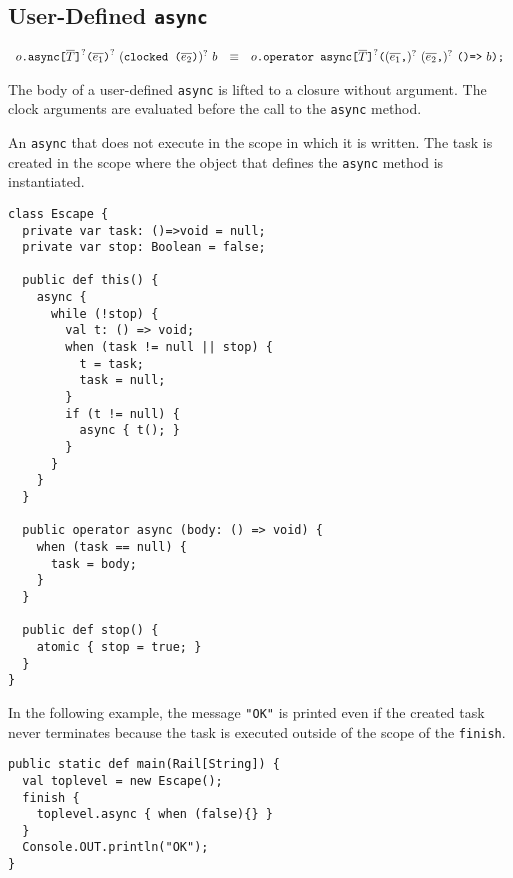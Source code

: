 \subsection{User-Defined \texttt{async}}
$$
\begin{array}{rcl}
  {o}\texttt{.async}\texttt{[}{\overline{T}}\texttt{]}^?\texttt{(}{\overline{e_1}}\texttt{)}^?~(\texttt{clocked~(}{\overline{e_2}}\texttt{)})^?~{b}
  & \equiv &
  {o}\texttt{.operator~async}\texttt{[}{\overline{T}}\texttt{]}^?\texttt{(} ({\overline{e_1}}\texttt{,})^?~ ({\overline{e_2}}\texttt{,})^?~ \texttt{()=>}~{b}\texttt{);}
\end{array}
$$

The body of a user-defined \verb+async+ is lifted to a closure without
argument. The clock arguments are evaluated before the call to the
\verb+async+ method.

\begin{example}
  An \verb+async+ that does not execute in the scope in which it is
  written. The task is created in the scope where the object that
  defines the \verb+async+ method is instantiated.
\begin{verbatim}
class Escape {
  private var task: ()=>void = null;
  private var stop: Boolean = false;

  public def this() {
    async {
      while (!stop) {
        val t: () => void;
        when (task != null || stop) {
          t = task;
          task = null;
        }
        if (t != null) {
          async { t(); }
        }
      }
    }
  }

  public operator async (body: () => void) {
    when (task == null) {
      task = body;
    }
  }

  public def stop() {
    atomic { stop = true; }
  }
}
\end{verbatim}
  In the following example, the message \verb+"OK"+ is printed even if
  the created task never terminates because the task is executed
  outside of the scope of the \verb+finish+.
\begin{verbatim}
public static def main(Rail[String]) {
  val toplevel = new Escape();
  finish {
    toplevel.async { when (false){} }
  }
  Console.OUT.println("OK");
}
\end{verbatim}
\end{example}

